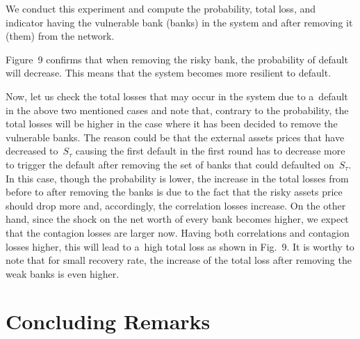 \begin{multicols}{2}
We conduct this experiment and compute the probability, total loss, and indicator 
having the vulnerable bank (banks) in the system and after removing it (them) 
from the network.

Figure~9 confirms that when removing the risky bank, the probability of 
default will decrease. This means that the system becomes more resilient to 
default.



Now, let us check the total losses that may occur in the system due to a~default in 
the above two mentioned cases and note that, contrary to the probability, the 
total losses will be higher in the case where it has been decided to remove the 
vulnerable banks. The reason could be that the external assets prices that have 
decreased to~$S_\tau$ causing the first default in the first round has to 
decrease more to trigger the default after removing the set of banks that could 
defaulted on~$S_\tau$. 
In this case, though the probability is lower, the increase in the total losses 
from before to after removing the banks is due to the fact 
that the risky assets price should drop more and, accordingly, the correlation 
losses increase. On the other hand, since the shock on the net worth of every 
bank becomes higher, we expect that the contagion losses are larger now.
Having both correlations and contagion losses higher, this will lead to a~high 
total loss as shown in Fig.~9. It is worthy to note that for small 
recovery rate, the increase of the total loss after removing the weak banks is 
even higher.




\section{Concluding Remarks} 


\end{multicols}
